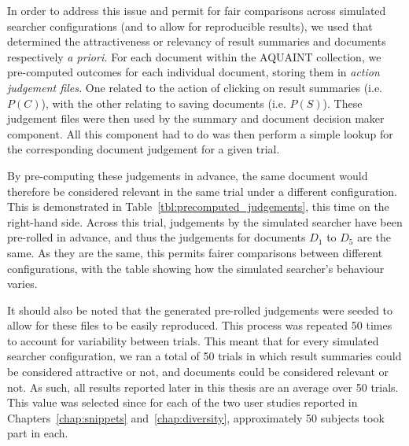 In order to address this issue and permit for fair comparisons across simulated searcher configurations (and to allow for reproducible results), we used  that determined the attractiveness or relevancy of result summaries and documents respectively \emph{a priori.} For each document within the AQUAINT collection, we pre-computed outcomes for each individual document, storing them in \emph{action judgement files.} One related to the action of clicking on result summaries (i.e. $P(C)$), with the other relating to saving documents (i.e. $P(S)$). These judgement files were then used by the summary and document decision maker component. All this component had to do was then perform a simple lookup for the corresponding document judgement for a given trial.

By pre-computing these judgements in advance, the same document would therefore be considered relevant in the same trial under a different configuration. This is demonstrated in Table~\ref{tbl:precomputed_judgements}, this time on the right-hand side. Across this trial, judgements by the simulated searcher have been pre-rolled in advance, and thus the judgements for documents $D_1$ to $D_5$ are the same. As they are the same, this permits fairer comparisons between different configurations, with the table showing how the simulated searcher's behaviour varies.

It should also be noted that the generated pre-rolled judgements were seeded to allow for these files to be easily reproduced. This process was repeated 50 times to account for variability between trials. This meant that for every simulated searcher configuration, we ran a total of 50 trials in which result summaries could be considered attractive or not, and documents could be considered relevant or not. As such, all results reported later in this thesis are an average over 50 trials. This value was selected since for each of the two user studies reported in Chapters~\ref{chap:snippets} and~\ref{chap:diversity}, approximately 50 subjects took part in each.

